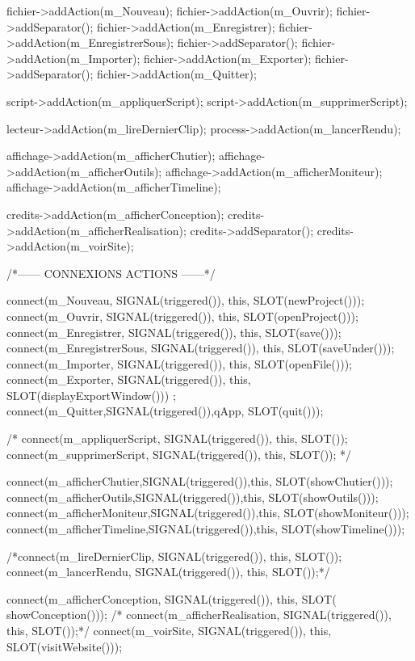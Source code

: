 \begin{DoxyCode}
{    fichier->addAction(m_Nouveau);
    fichier->addAction(m_Ouvrir);
    fichier->addSeparator();
    fichier->addAction(m_Enregistrer);
    fichier->addAction(m_EnregistrerSous);
    fichier->addSeparator();
    fichier->addAction(m_Importer);
    fichier->addAction(m_Exporter);
    fichier->addSeparator();
    fichier->addAction(m_Quitter);

    script->addAction(m_appliquerScript);
    script->addAction(m_supprimerScript);

    lecteur->addAction(m_lireDernierClip);
    process->addAction(m_lancerRendu);

    affichage->addAction(m_afficherChutier);
    affichage->addAction(m_afficherOutils);
    affichage->addAction(m_afficherMoniteur);
    affichage->addAction(m_afficherTimeline);

    credits->addAction(m_afficherConception);
    credits->addAction(m_afficherRealisation);
    credits->addSeparator();
    credits->addAction(m_voirSite);

    /*------  CONNEXIONS ACTIONS  ------*/

    connect(m_Nouveau, SIGNAL(triggered()), this, SLOT(newProject()));
    connect(m_Ouvrir, SIGNAL(triggered()), this, SLOT(openProject()));
    connect(m_Enregistrer, SIGNAL(triggered()), this, SLOT(save()));
    connect(m_EnregistrerSous, SIGNAL(triggered()), this, SLOT(saveUnder()));
    connect(m_Importer, SIGNAL(triggered()), this, SLOT(openFile()));
    connect(m_Exporter, SIGNAL(triggered()), this, SLOT(displayExportWindow()))
      ;
    connect(m_Quitter,SIGNAL(triggered()),qApp, SLOT(quit()));

    /*
    connect(m_appliquerScript, SIGNAL(triggered()), this, SLOT());
    connect(m_supprimerScript, SIGNAL(triggered()), this, SLOT());
*/

    connect(m_afficherChutier,SIGNAL(triggered()),this, SLOT(showChutier()));
    connect(m_afficherOutils,SIGNAL(triggered()),this, SLOT(showOutils()));
    connect(m_afficherMoniteur,SIGNAL(triggered()),this, SLOT(showMoniteur()));
    connect(m_afficherTimeline,SIGNAL(triggered()),this, SLOT(showTimeline()));

    /*connect(m_lireDernierClip, SIGNAL(triggered()), this, SLOT());
    connect(m_lancerRendu, SIGNAL(triggered()), this, SLOT());*/

    connect(m_afficherConception, SIGNAL(triggered()), this, SLOT(
      showConception()));
  /*    connect(m_afficherRealisation, SIGNAL(triggered()), this, SLOT());*/
    connect(m_voirSite, SIGNAL(triggered()), this, SLOT(visitWebsite()));

}
\end{DoxyCode}
